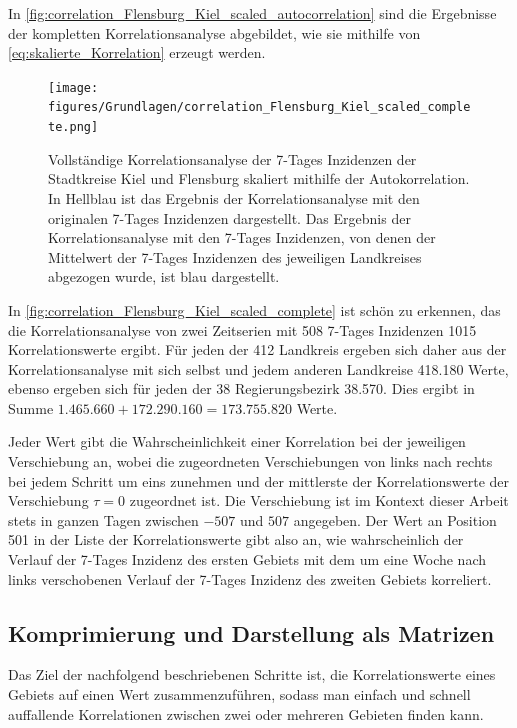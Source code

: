 In \autoref{fig:correlation_Flensburg_Kiel_scaled_autocorrelation} sind die Ergebnisse der kompletten Korrelationsanalyse abgebildet, wie sie mithilfe von \autoref{eq:skalierte_Korrelation} erzeugt werden.
\begin{figure}[H]
    \centering
    \texttt{[image: figures/Grundlagen/correlation\_Flensburg\_Kiel\_scaled\_complete.png]}
    \caption{Vollständige Korrelationsanalyse der 7-Tages Inzidenzen der Stadtkreise Kiel und Flensburg skaliert mithilfe der Autokorrelation.
    In Hellblau ist das Ergebnis der Korrelationsanalyse mit den originalen 7-Tages Inzidenzen dargestellt. Das Ergebnis der Korrelationsanalyse mit den 7-Tages Inzidenzen, von denen der Mittelwert der 7-Tages Inzidenzen des jeweiligen Landkreises abgezogen wurde, ist blau dargestellt.}
    \label{fig:correlation_Flensburg_Kiel_scaled_complete}
\end{figure}

In \autoref{fig:correlation_Flensburg_Kiel_scaled_complete} ist schön zu erkennen, das die Korrelationsanalyse von zwei Zeitserien mit 508 7-Tages Inzidenzen 1015 Korrelationswerte ergibt.
Für jeden der 412 Landkreis ergeben sich daher aus der Korrelationsanalyse mit sich selbst und jedem anderen Landkreise 418.180 Werte, ebenso ergeben sich für jeden der 38 Regierungsbezirk 38.570. Dies ergibt in Summe $
1.465.660+172.290.160=173.755.820$ Werte.

Jeder Wert gibt die Wahrscheinlichkeit einer Korrelation bei der jeweiligen Verschiebung an, wobei die zugeordneten Verschiebungen von links nach rechts bei jedem Schritt um eins zunehmen und der mittlerste der Korrelationswerte der Verschiebung $\tau = 0$ zugeordnet ist. Die Verschiebung ist im Kontext dieser Arbeit stets in ganzen Tagen zwischen $-507$ und $507$ angegeben. Der Wert an Position 501 in der Liste der Korrelationswerte gibt also an, wie wahrscheinlich der Verlauf der 7-Tages Inzidenz des ersten Gebiets mit dem um eine Woche nach links verschobenen Verlauf der 7-Tages Inzidenz des zweiten Gebiets korreliert.

\subsection{Komprimierung und Darstellung als Matrizen}\label{sec:Grundlagen:Korrelation:Komprimierung}
Das Ziel der nachfolgend beschriebenen Schritte ist, die Korrelationswerte eines Gebiets auf einen Wert zusammenzuführen, sodass man einfach und schnell auffallende Korrelationen zwischen zwei oder mehreren Gebieten finden kann.

